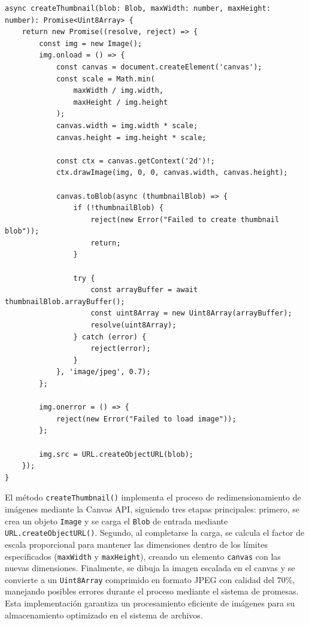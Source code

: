 \documentclass[11pt, a4paper]{article}
\begin{document}
                \begin{lstlisting}[caption={createThumbnail()}]
async createThumbnail(blob: Blob, maxWidth: number, maxHeight: number): Promise<Uint8Array> {
    return new Promise((resolve, reject) => {
        const img = new Image();
        img.onload = () => {
            const canvas = document.createElement('canvas');
            const scale = Math.min(
                maxWidth / img.width,
                maxHeight / img.height
            );
            canvas.width = img.width * scale;
            canvas.height = img.height * scale;
            
            const ctx = canvas.getContext('2d')!;
            ctx.drawImage(img, 0, 0, canvas.width, canvas.height);
            
            canvas.toBlob(async (thumbnailBlob) => {
                if (!thumbnailBlob) {
                    reject(new Error("Failed to create thumbnail blob"));
                    return;
                }
                
                try {
                    const arrayBuffer = await thumbnailBlob.arrayBuffer();
                    const uint8Array = new Uint8Array(arrayBuffer);
                    resolve(uint8Array);
                } catch (error) {
                    reject(error);
                }
            }, 'image/jpeg', 0.7);
        };
        
        img.onerror = () => {
            reject(new Error("Failed to load image"));
        };
        
        img.src = URL.createObjectURL(blob);
    });
}
                \end{lstlisting}

                El método \texttt{createThumbnail()} implementa el proceso de redimensionamiento de imágenes mediante la Canvas API, siguiendo tres etapas principales: primero, se crea un objeto \texttt{Image} y se carga el \texttt{Blob} de entrada mediante \texttt{URL.createObjectURL()}. Segundo, al completarse la carga, se calcula el factor de escala proporcional para mantener las dimensiones dentro de los límites especificados (\texttt{maxWidth} y \texttt{maxHeight}), creando un elemento \texttt{canvas} con las nuevas dimensiones. Finalmente, se dibuja la imagen escalada en el canvas y se convierte a un \texttt{Uint8Array} comprimido en formato JPEG con calidad del 70\%, manejando posibles errores durante el proceso mediante el sistema de promesas. Esta implementación garantiza un procesamiento eficiente de imágenes para su almacenamiento optimizado en el sistema de archivos. \\
\end{document}
